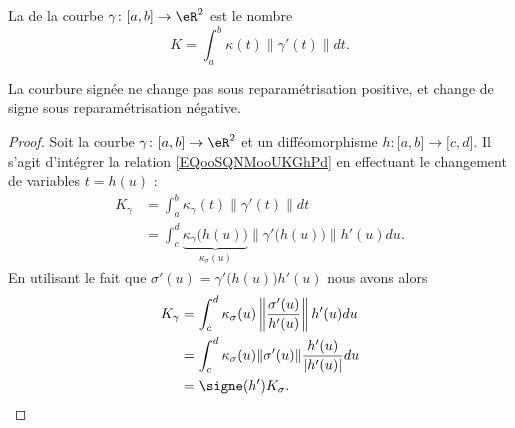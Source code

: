 \begin{definition}
    La  de la courbe \( \gamma\colon \mathopen[ a , b \mathclose] \to \eR^2 \) est le nombre
    \begin{equation}        \label{EQooTIFWooQflOfd}
        K=\int_a^b\kappa(t)\| \gamma'(t) \|dt.
    \end{equation}
\end{definition}

\begin{lemma}
    La courbure signée ne change pas sous reparamétrisation positive, et change de signe sous reparamétrisation négative.
\end{lemma}

\begin{proof}
    Soit la courbe \( \gamma\colon \mathopen[ a , b \mathclose]\to \eR^2\) et un difféomorphisme \( h\colon \mathopen[ a , b \mathclose]\to \mathopen[ c , d \mathclose]\). Il s'agit d'intégrer la relation \eqref{EQooSQNMooUKGhPd} en effectuant le changement de variables \( t=h(u)\) :
    \begin{subequations}
        \begin{align}
            K_{\gamma}&=\int_a^b\kappa_{\gamma}(t)\| \gamma'(t) \|dt\\
            &=\int_c^d\underbrace{\kappa_{\gamma}\big( h(u) \big)}_{\kappa_{\sigma}(u)}\| \gamma'\big( h(u) \big) \|h'(u)du.
        \end{align}
    \end{subequations}
    En utilisant le fait que \( \sigma'(u)=\gamma'\big( h(u) \big)h'(u)  \) nous avons alors
    \begin{subequations}
        \begin{align}
            K_{\gamma}&=\int_{c}^d\kappa_{\sigma}(u)\left\| \frac{ \sigma'(u) }{ h'(u) }   \right\|h'(u)du\\
            &=\int_c^d\kappa_{\sigma}(u)\| \sigma'(u) \|\frac{ h'(u) }{ | h'(u) | }du\\
            &=\signe(h')K_{\sigma}.
        \end{align}
    \end{subequations}
\end{proof}

